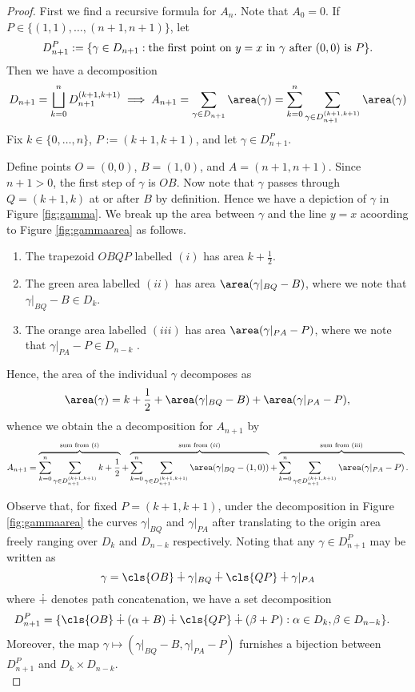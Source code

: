 \documentclass[12pt]{article}
\begin{document}
\begin{proof}
  First we find a recursive formula for $ A_{n} $. Note that $ A_{0} = 0 $. If $ P\in\{(1,1),\ldots,(n+1,n+1)\} $, let 
  \[
    D_{n+1}^{P} := \{\gamma\in D_{n+1}: \text{the first point on $ y=x $ in $ \gamma $ after $ (0,0) $ is $ P $}\}.
  \]
  Then we have a decomposition
  \[
    D_{n+1} =\bigsqcup_{k=0}^{n} D_{n+1}^{(k+1,k+1)} \implies A_{n+1} = \sum_{\gamma\in D_{n+1}} \area(\gamma) = \sum_{k=0}^{n} \sum_{\gamma\in D_{n+1}^{(k+1,k+1)}} \area(\gamma)
  \]
  Fix $ k\in \{0,\ldots, n\} $, $ P:=(k+1, k+1) $, and let $ \gamma\in D_{n+1}^{P} $.

  Define points $ O=(0,0) $, $ B=(1,0) $, and $ A=(n+1,n+1) $. Since $ n+1>0 $, the first step of $ \gamma $ is $ OB $. Now note that $ \gamma $ passes through $ Q=(k+1,k) $ at or after $ B $ by definition. Hence we have a depiction of $ \gamma $ in Figure \ref{fig:gamma}. We break up the area between $ \gamma $ and the line $ y=x $ acoording to Figure \ref{fig:gammaarea} as follows.

  \begin{enumerate}
    \item The trapezoid $OBQP$ labelled $ (i) $ has area $ k+\frac{1}{2} $.
    \item The green area labelled $ (ii) $ has area $ \area(\gamma\vert_{BQ} - B) $, where we note that $ \gamma\vert_{BQ}-B \in D_{k} $.
    \item The orange area labelled $ (iii) $ has area $ \area(\gamma\vert_{PA} - P) $, where we note that $ \gamma\vert_{PA}-P \in D_{n-k} $ .
  \end{enumerate}
  Hence, the area of the individual $ \gamma $ decomposes as
  \[
    \area(\gamma) = k+\frac{1}{2} + \area(\gamma\vert_{BQ} - B) + \area(\gamma\vert_{PA} - P),
  \]
  whence we obtain the a decomposition for $ A_{n+1} $ by 
  \[    
    A_{n+1} = \overbrace{\sum_{k=0}^{n} \sum_{\gamma\in D_{n+1}^{(k+1,k+1)}}  k+\frac{1}{2}}^{\text{sum from }(i)} + \overbrace{\sum_{k=0}^{n} \sum_{\gamma\in D_{n+1}^{(k+1,k+1)}}\area(\gamma\vert_{BQ} - (1,0))}^{\text{sum from }(ii)} + \overbrace{\sum_{k=0}^{n} \sum_{\gamma\in D_{n+1}^{(k+1,k+1)}}\area(\gamma\vert_{PA} - P)}^{\text{sum from (iii)}}.
  \]

  Observe that, for fixed $ P=(k+1,k+1) $, under the decomposition in Figure \ref{fig:gammaarea} the curves $ \gamma\vert_{BQ} $ and $ \gamma\vert_{PA} $ after translating to the origin area freely ranging over $ D_{k} $ and $ D_{n-k} $ respectively. Noting that any $ \gamma\in D_{n+1}^{P} $ may be written as 
  \[
    \gamma = \cls{OB} \dotplus \gamma\vert_{BQ} \dotplus \cls{QP} \dotplus \gamma\vert_{PA}
  \]
  where $ \dotplus $ denotes path concatenation, we have a set decomposition
  \begin{align*}
    D_{n+1}^{P} &= \{ \cls{OB} \dotplus (\alpha + B) \dotplus \cls{QP} \dotplus (\beta + P): \alpha\in D_{k}, \beta\in D_{n-k}\}.
  \end{align*}
  Moreover, the map $ \gamma\mapsto (\gamma\vert_{BQ} - B, \gamma\vert_{PA} - P) $ furnishes a bijection between $ D_{n+1}^{P} $ and $ D_{k}\times D_{n-k} $.\\


\end{proof}
\end{document}
